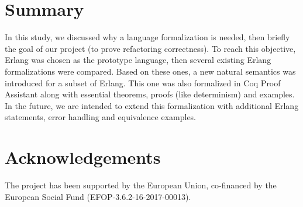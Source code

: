 \documentclass[12pt]{article}
\theoremstyle{definition}
\numberwithin{equation}{section}
\begin{document}
\section{Summary}

In this study, we discussed why a language formalization is needed, then briefly the goal of our project (to prove refactoring correctness). To reach this objective, Erlang was chosen as the prototype language, then several existing Erlang formalizations were compared. Based on these ones, a new natural semantics was introduced for a subset of Erlang. This one was also formalized in Coq Proof Assistant along with essential theorems, proofs (like determinism) and examples. In the future, we are intended to extend this formalization with additional Erlang statements, error handling and equivalence examples.

\section*{Acknowledgements}

The project has been supported by the European Union, co-financed by the European Social  Fund  (EFOP-3.6.2-16-2017-00013).


{}

\end{document}
